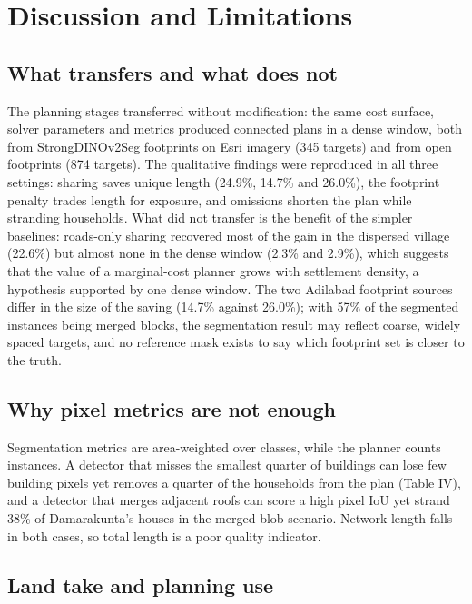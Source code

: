 \documentclass[journal]{IEEEtran}
\begin{document}
\section{Discussion and Limitations}

\subsection{What transfers and what does not}

The planning stages transferred without modification: the same cost surface, solver parameters and metrics produced connected plans in a dense window, both from StrongDINOv2Seg footprints on Esri imagery (345 targets) and from open footprints (874 targets). The qualitative findings were reproduced in all three settings: sharing saves unique length (24.9\%, 14.7\% and 26.0\%), the footprint penalty trades length for exposure, and omissions shorten the plan while stranding households. What did not transfer is the benefit of the simpler baselines: roads-only sharing recovered most of the gain in the dispersed village (22.6\%) but almost none in the dense window (2.3\% and 2.9\%), which suggests that the value of a marginal-cost planner grows with settlement density, a hypothesis supported by one dense window. The two Adilabad footprint sources differ in the size of the saving (14.7\% against 26.0\%); with 57\% of the segmented instances being merged blocks, the segmentation result may reflect coarse, widely spaced targets, and no reference mask exists to say which footprint set is closer to the truth.

\subsection{Why pixel metrics are not enough}

Segmentation metrics are area-weighted over classes, while the planner counts instances. A detector that misses the smallest quarter of buildings can lose few building pixels yet removes a quarter of the households from the plan (Table IV), and a detector that merges adjacent roofs can score a high pixel IoU yet strand 38\% of Damarakunta's houses in the merged-blob scenario. Network length falls in both cases, so total length is a poor quality indicator.

\subsection{Land take and planning use}
\end{document}
